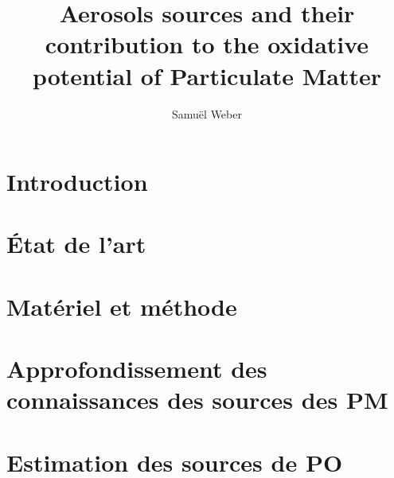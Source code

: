 \documentclass[a4paper,11pt]{book}
\author{Samuël Weber}
\title{Aerosols sources and their contribution to the oxidative potential of Particulate Matter}
\begin{document}
% 
\maketitle

\frontmatter

\clearpage
% 
%

\tableofcontents

\mainmatter

\chapter*{Introduction}%
\label{cha:introduction}

\clearpage
\printbibliography[segment=\therefsegment,heading=subbibliography]

\chapter{État de l'art}
\label{cha:etat_de_lart}
\PartialToc
\clearpage

\clearpage
\printbibliography[segment=\therefsegment,heading=subbibliography]

\chapter{Matériel et méthode}
\label{cha:materiel_et_methode}
\PartialToc
\clearpage

\clearpage
\printbibliography[segment=\therefsegment,heading=subbibliography]

\chapter{Approfondissement des connaissances des sources des PM}%
\label{cha:approfondissement_des_connaissances_des_sources_des_pm}
\PartialToc
\clearpage

\clearpage
\printbibliography[segment=\therefsegment,heading=subbibliography]

\chapter{Estimation des sources de PO}
\label{cha:estimation_des_sources_de_PO}
\PartialToc
\clearpage

\clearpage
\printbibliography[segment=\therefsegment,heading=subbibliography]
\end{document}
